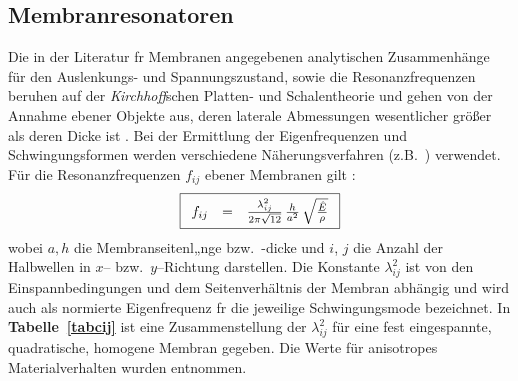 \subsection{Membranresonatoren}
\label{membranreson}

Die in der Literatur fr Membranen angegebenen analytischen Zusammenhänge
für den Auslenkungs- und Spannungszustand, sowie die Resonanzfrequenzen
beruhen auf der {\sl Kirchhoff}schen Platten- und Schalentheorie und gehen
von der Annahme ebener Objekte aus, deren laterale Abmessungen
wesentlicher größer als deren Dicke ist \cite{Tim87}. Bei der Ermittlung der
Eigenfrequenzen und Schwingungsformen werden verschiedene
Näherungsverfahren (z.B.\ \cite{You50}) verwendet. Für die Resonanzfrequenzen
$f_{ij}$ ebener Membranen gilt \cite{Ble84}:
%
\begin{equation}
\label{memfreq}
\fbox{$
 \displaystyle
 \begin{array}{rcl}
     f_{ij} & = & \frac{\lambda_{ij}^{2}}{2 \pi \sqrt{12}} \,
     \frac{h}{a^{2}} \, \sqrt{ \frac {\hat E}{\rho}}
 \end{array}
 $}
\end{equation}
%
wobei $a, h$ die Membranseitenl„nge bzw.\ -dicke und
$i$, $j$ die Anzahl der Halbwellen in $x$-- bzw.\ $y$--Richtung darstellen.
Die Konstante $\lambda^{2}_{ij}$ ist von den Einspannbedingungen und dem
Seitenverhältnis der Membran abhängig und wird auch als normierte
Eigenfrequenz fr die jeweilige Schwingungsmode bezeichnet. In
{\bf Tabelle~\ref{tabcij}} ist eine Zusammenstellung der $\lambda_{ij}^{2}$
für eine fest eingespannte, quadratische, homogene Membran gegeben.
Die Werte für anisotropes Materialverhalten wurden \cite{Pon91} entnommen.
